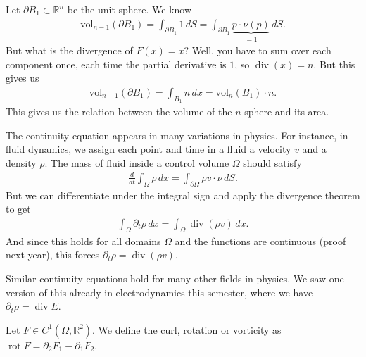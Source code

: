 \begin{eg}
	Let $\partial B_{1} \subset \mathbb{R}^{n}$ be the unit sphere. We know
	\begin{align*}
		\text{vol}_{n-1}(\partial B_{1}) = \int_{\partial B_{1}} 1 \, dS = \int_{\partial B_{1}} \underbrace{p \cdot \nu(p) }_{=1} \, d S.
	\end{align*}
	But what is the divergence of $F(x) = x$? Well, you have to sum over each component once, each time the partial derivative is $1$, so $\operatorname{div}(x) = n$. But this gives us
	\begin{align*}
		\text{vol}_{n-1}(\partial B_{1}) = \int_{B_{1}} n \, dx = \text{vol}_{n}(B_{1}) \cdot n.
	\end{align*}
	This gives us the relation between the volume of the $n$-sphere and its area.
\end{eg}

\begin{eg}
	The continuity equation appears in many variations in physics. For instance, in fluid dynamics, we assign each point and time in a fluid a velocity $v$ and a density $\rho$. The mass of fluid inside a control volume $\Omega$ should satisfy
	\begin{align*}
		\frac{d}{dt} \int_{\Omega} \rho \, dx = \int_{\partial \Omega} \rho v \cdot \nu \, dS.
	\end{align*}
	But we can differentiate under the integral sign and apply the divergence theorem to get
	\begin{align*}
		\int_{\Omega} \partial_{t} \rho \, dx = \int_{\Omega} \operatorname{div}(\rho v) \, dx.
	\end{align*}
	And since this holds for all domains $\Omega$ and the functions are continuous (proof next year), this forces $\partial_{t} \rho = \operatorname{div}(\rho v)$.

	Similar continuity equations hold for many other fields in physics. We saw one version of this already in electrodynamics this semester, where we have $\partial_{t} \rho = \operatorname{div}E$.
\end{eg}

\begin{definition}\label{def:curl}
	Let $F \in C^{1}(\Omega, \mathbb{R}^{2})$. We define the curl, rotation or vorticity as $\operatorname{rot} F = \partial_{2} F_{1} - \partial_{1} F_{2}$.
\end{definition}

